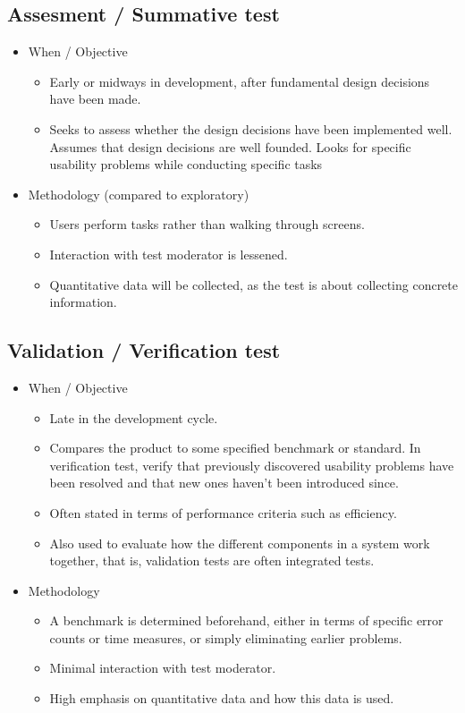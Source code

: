 \subsection{Assesment / Summative test}
\begin{itemize}
	\item When / Objective
	\begin{itemize}
		\item Early or midways in development, after fundamental design decisions have been made.
		\item Seeks to assess whether the design decisions have been implemented well. Assumes that design decisions are well founded. Looks for specific usability problems while conducting specific tasks
	\end{itemize}
	\item Methodology (compared to exploratory)
	\begin{itemize}
		\item Users perform tasks rather than walking through screens.
		\item Interaction with test moderator is lessened.
		\item Quantitative data will be collected, as the test is about collecting concrete information.
	\end{itemize}
\end{itemize}
\subsection{Validation / Verification test}
\begin{itemize}
	\item When / Objective
	\begin{itemize}
		\item Late in the development cycle.
		\item Compares the product to some specified benchmark or standard. In verification test, verify that previously discovered usability problems have been resolved and that new ones haven't been introduced since. 
		\item Often stated in terms of performance criteria such as efficiency.
		\item Also used to evaluate how the different components in a system work together, that is, validation tests are often integrated tests.
	\end{itemize}
	\item Methodology
	\begin{itemize}
		\item A benchmark is determined beforehand, either in terms of specific error counts or time measures, or simply eliminating earlier problems.
		\item Minimal interaction with test moderator.
		\item High emphasis on quantitative data and how this data is used. 
	\end{itemize}
\end{itemize}

